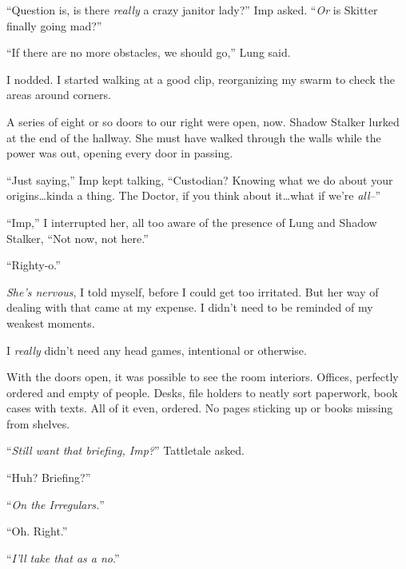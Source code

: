 ``Question is, is there \emph{reall}\emph{y }a crazy janitor lady?''  Imp asked.  ``\emph{Or} is Skitter finally going mad?''



``If there are no more obstacles, we should go,'' Lung said.



I nodded.  I started walking at a good clip, reorganizing my swarm to check the areas around corners.



A series of eight or so doors to our right were open, now.  Shadow Stalker lurked at the end of the hallway.  She must have walked through the walls while the power was out, opening every door in passing.



``Just saying,'' Imp kept talking, ``Custodian?  Knowing what we do about your origins\ldots kinda a thing.  The Doctor, if you think about it\ldots what if we're \emph{all}--''



``Imp,'' I interrupted her, all too aware of the presence of Lung and Shadow Stalker, ``Not now, not here.''



``Righty-o.''



\emph{She's nervous}, I told myself, before I could get too irritated.  But her way of dealing with that came at my expense.  I didn't need to be reminded of my weakest moments.



I \emph{really} didn't need any head games, intentional or otherwise.



With the doors open, it was possible to see the room interiors.  Offices, perfectly ordered and empty of people.  Desks, file holders to neatly sort paperwork, book cases with texts.  All of it even, ordered.  No pages sticking up or books missing from shelves.



``\emph{Still want that briefing, Imp?}'' Tattletale asked.



``Huh?  Briefing?''



``\emph{On the Irregulars.}''



``Oh.  Right.''



``\emph{I'll take that as a no}.''



